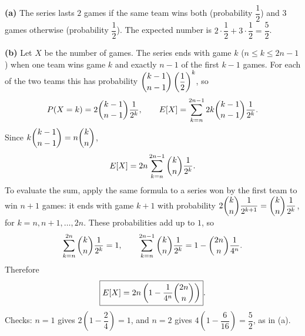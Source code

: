 \textbf{(a)} The series lasts $2$ games if the same team wins both (probability $\dfrac{1}{2}$) and $3$ games otherwise (probability $\dfrac{1}{2}$). The expected number is $2\cdot\dfrac{1}{2}+3\cdot\dfrac{1}{2}=\boxed{\dfrac{5}{2}}$.

\textbf{(b)} Let $X$ be the number of games. The series ends with game $k$ ($n\le k\le 2n-1$) when one team wins game $k$ and exactly $n-1$ of the first $k-1$ games. For each of the two teams this has probability $\dbinom{k-1}{n-1}\left(\dfrac{1}{2}\right)^{k}$, so
\[
P(X=k)=2\dbinom{k-1}{n-1}\dfrac{1}{2^k},\qquad E[X]=\sum_{k=n}^{2n-1}2k\dbinom{k-1}{n-1}\dfrac{1}{2^k}.
\]
Since $k\dbinom{k-1}{n-1}=n\dbinom{k}{n}$,
\[
E[X]=2n\sum_{k=n}^{2n-1}\dbinom kn\dfrac{1}{2^k}.
\]
To evaluate the sum, apply the same formula to a series won by the first team to win $n+1$ games: it ends with game $k+1$ with probability $2\dbinom{k}{n}\dfrac{1}{2^{k+1}}=\dbinom kn\dfrac{1}{2^k}$, for $k=n,n+1,\dots,2n$. These probabilities add up to $1$, so
\[
\sum_{k=n}^{2n}\dbinom kn\dfrac{1}{2^k}=1,\qquad \sum_{k=n}^{2n-1}\dbinom kn\dfrac{1}{2^k}=1-\dbinom{2n}{n}\dfrac{1}{4^n}.
\]
Therefore
\[
\boxed{E[X]=2n\left(1-\dfrac{1}{4^n}\dbinom{2n}{n}\right)}.
\]
Checks: $n=1$ gives $2\left(1-\dfrac{2}{4}\right)=1$, and $n=2$ gives $4\left(1-\dfrac{6}{16}\right)=\dfrac{5}{2}$, as in (a).
